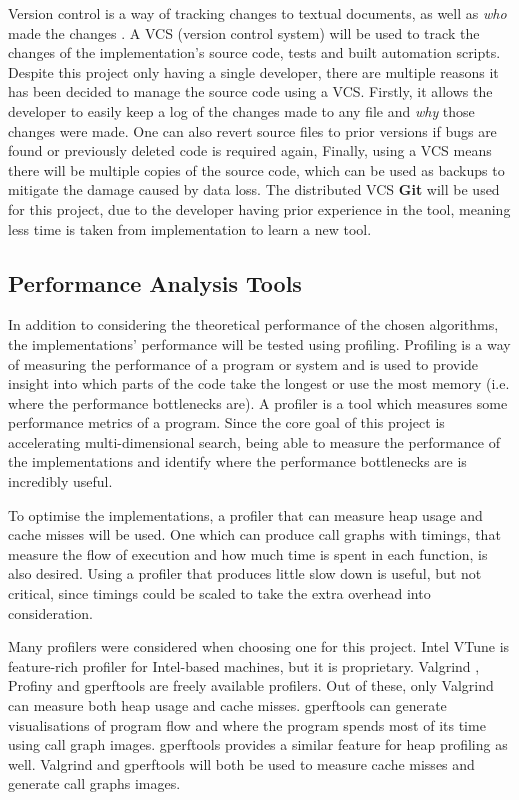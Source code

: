 Version control is a way of tracking changes to textual documents, as well as \textit{who} made the changes \cite{pragmatic-version-control}. A VCS (version control system) will be used to track the changes of the implementation's source code, tests and built automation scripts. Despite this project only having a single developer, there are multiple reasons it has been decided to manage the source code using a VCS. Firstly, it allows the developer to easily keep a log of the changes made to any file and \textit{why} those changes were made. One can also revert source files to prior versions if bugs are found or previously deleted code is required again, Finally, using a VCS means there will be multiple copies of the source code, which can be used as backups to mitigate the damage caused by data loss. The distributed VCS \textbf{Git} \cite{git} will be used for this project, due to the developer having prior experience in the tool, meaning less time is taken from implementation to learn a new tool.

\subsection{Performance Analysis Tools}

In addition to considering the theoretical performance of the chosen algorithms, the implementations' performance will be tested using profiling. Profiling is a way of measuring the performance of a program or system \cite{efficient-cpp} and is used to provide insight into which parts of the code take the longest or use the most memory (i.e. where the performance bottlenecks are). A profiler is a tool which measures some performance metrics of a program. Since the core goal of this project is accelerating multi-dimensional search, being able to measure the performance of the implementations and identify where the performance bottlenecks are is incredibly useful.

To optimise the implementations, a profiler that can measure heap usage and cache misses will be used. One which can produce call graphs with timings, that measure the flow of execution and how much time is spent in each function, is also desired. Using a profiler that produces little slow down is useful, but not critical, since timings could be scaled to take the extra overhead into consideration. 

Many profilers were considered when choosing one for this project. Intel VTune \cite{intel-vtune} is feature-rich profiler for Intel-based machines, but it is proprietary. Valgrind \cite{valgrind}, Profiny \cite{profiny} and gperftools \cite{gperftools} are freely available profilers. Out of these, only Valgrind can measure both heap usage and cache misses. gperftools can generate visualisations of program flow and where the program spends most of its time using call graph images. gperftools provides a similar feature for heap profiling as well. Valgrind and gperftools will both be used to measure cache misses and generate call graphs images.

